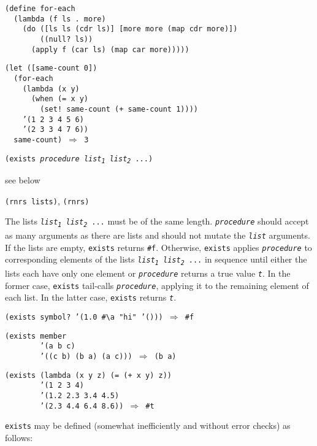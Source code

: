 \begin{alltt}
(define for-each
  (lambda (f ls . more)
    (do ([ls ls (cdr ls)] [more more (map cdr more)])
        ((null? ls))
      (apply f (car ls) (map car more)))))

(let ([same-count 0])
  (for-each
    (lambda (x y)
      (when (= x y)
        (set! same-count (+ same-count 1))))
    '(1 2 3 4 5 6)
    '(2 3 3 4 7 6))
  same-count) \(\Rightarrow\) 3
\end{alltt}

\begin{description}

\label{control_s36}\item[procedure] \texttt{(exists \textit{procedure} \textit{list\textsubscript{1}} \textit{list\textsubscript{2}} ...)}



\item[returns] see below


\item[libraries] \texttt{(rnrs lists)}, \texttt{(rnrs)}
\end{description}


The lists \texttt{\textit{list\textsubscript{1}} \textit{list\textsubscript{2}} ...} must be of the same length.
\texttt{\textit{procedure}} should accept as many arguments as there are lists and should
not mutate the \texttt{\textit{list}} arguments.
If the lists are empty, \texttt{exists} returns \texttt{\#{}f}.
Otherwise, \texttt{exists} applies \texttt{\textit{procedure}} to corresponding elements
of the lists \texttt{\textit{list\textsubscript{1}} \textit{list\textsubscript{2}} ...} in sequence until either the
lists each have only one element or \texttt{\textit{procedure}} returns a true value \texttt{\textit{t}}.
In the former case, \texttt{exists} tail-calls \texttt{\textit{procedure}}, applying it to the
remaining element of each list.
In the latter case, \texttt{exists} returns \texttt{\textit{t}}.


\begin{alltt}
(exists symbol? '(1.0 \#{}\textbackslash{}a "hi" '())) \(\Rightarrow\) \#{}f

(exists member
        '(a b c)
        '((c b) (b a) (a c))) \(\Rightarrow\) (b a)

(exists (lambda (x y z) (= (+ x y) z))
        '(1 2 3 4)
        '(1.2 2.3 3.4 4.5)
        '(2.3 4.4 6.4 8.6)) \(\Rightarrow\) \#{}t
\end{alltt}

\texttt{exists} may be defined (somewhat inefficiently and without error
checks) as follows:

